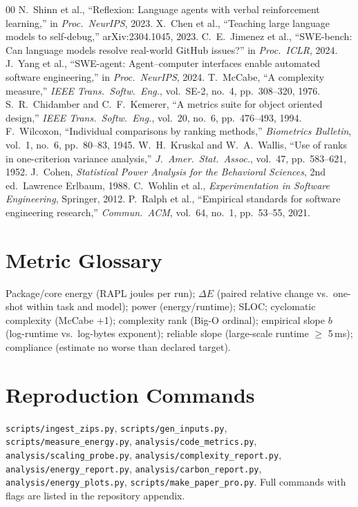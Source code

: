\documentclass[journal]{IEEEtran}
\begin{document}
\begin{thebibliography}{00}
 N.~Shinn et al., ``Reflexion: Language agents with verbal
reinforcement learning,'' in \emph{Proc.\ NeurIPS}, 2023.
 X.~Chen et al., ``Teaching large language models
to self-debug,'' arXiv:2304.1045, 2023.
 C.~E.~Jimenez et al., ``SWE-bench: Can language models
resolve real-world GitHub issues?'' in \emph{Proc.\ ICLR}, 2024.
 J.~Yang et al., ``SWE-agent: Agent--computer interfaces
enable automated software engineering,'' in \emph{Proc.\ NeurIPS}, 2024.
 T.~McCabe, ``A complexity measure,'' \emph{IEEE Trans.\
Softw.\ Eng.}, vol.~SE-2, no.~4, pp.~308--320, 1976.
 S.~R.~Chidamber and C.~F.~Kemerer, ``A metrics suite
for object oriented design,'' \emph{IEEE Trans.\ Softw.\ Eng.}, vol.~20,
no.~6, pp.~476--493, 1994.
 F.~Wilcoxon, ``Individual comparisons by ranking
methods,'' \emph{Biometrics Bulletin}, vol.~1, no.~6, pp.~80--83, 1945.
\bibitem{kruskal1952} W.~H.~Kruskal and W.~A.~Wallis, ``Use of ranks in
one-criterion variance analysis,'' \emph{J.\ Amer.\ Stat.\ Assoc.}, vol.~47,
pp.~583--621, 1952.
 J.~Cohen, \emph{Statistical Power Analysis for the
Behavioral Sciences}, 2nd ed.\ Lawrence Erlbaum, 1988.
 C.~Wohlin et al., \emph{Experimentation in Software
Engineering}, Springer, 2012.
 P.~Ralph et al., ``Empirical standards for software
engineering research,'' \emph{Commun.\ ACM}, vol.~64, no.~1, pp.~53--55,
2021.
\end{thebibliography}

\appendices
\section{Metric Glossary}
Package/core energy (RAPL joules per run); $\Delta E$ (paired relative change
vs.\ one-shot within task and model); power (energy/runtime); SLOC;
cyclomatic complexity (McCabe +1); complexity rank (Big-O ordinal);
empirical slope $b$ (log-runtime vs.\ log-bytes exponent); reliable slope
(large-scale runtime $\geq$ 5\,ms); compliance (estimate no worse than
declared target).

\section{Reproduction Commands}
\texttt{scripts/ingest\_zips.py}, \texttt{scripts/gen\_inputs.py},
\texttt{scripts/measure\_energy.py}, \texttt{analysis/code\_metrics.py},
\texttt{analysis/scaling\_probe.py}, \texttt{analysis/complexity\_report.py},
\texttt{analysis/energy\_report.py}, \texttt{analysis/carbon\_report.py},
\texttt{analysis/energy\_plots.py}, \texttt{scripts/make\_paper\_pro.py}.
Full commands with flags are listed in the repository appendix.
\end{document}
